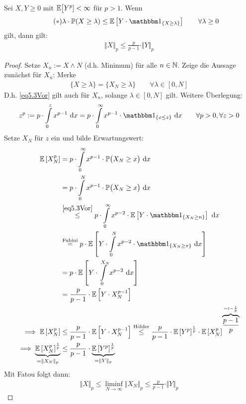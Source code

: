 \begin{lemma}\label{lemma5.3}
Sei $X,Y\geq0$ mit $\mathbb{E}\big[Y^p]<\infty$ für $p>1$. Wenn
\begin{align}\label{eq5.3Vor}\tag{$\ast$}
\lambda\cdot\P(X\geq\lambda)\leq\E\left[Y\cdot\indi_{\lbrace X\geq\lambda\rbrace}\right]\qquad\forall\lambda\geq0
\end{align}
gilt, dann gilt:
\begin{align*}
\Vert X\Vert_p\leq\frac{p}{p-1}\cdot\Vert Y\Vert_p
\end{align*}
\end{lemma}
\begin{proof}
Setze $X_n:=X\wedge N$ (d.h. Minimum) für alle $n\in\mathbb{N}$. Zeige die Aussage zunächst für $X_n$: Merke
\begin{align*}
\lbrace X\geq\lambda\rbrace=\lbrace X_N\geq\lambda\rbrace\qquad\forall\lambda\in[0,N]
\end{align*}
D.h. \eqref{eq5.3Vor} gilt auch für $X_n$, solange $\lambda\in[0,N]$ gilt. Weitere Überlegung:
\begin{align*} %
z^p:=p\cdot\int\limits_0^z x^{p-1}\d x=p\cdot\int\limits_0^\infty x^{p-1}\cdot\indi_{\lbrace x\leq z\rbrace}\d x\qquad\forall p>0,\forall z>0
\end{align*}
Setze $X_N$ für $z$ ein und bilde Erwartungswert:
\begin{align*}
\E\left[X_N^p\right]
&=p\cdot\int\limits_0^\infty x^{p-1}\cdot\P\big(X_N\geq x\big)\d x\\
&=p\cdot\int\limits_0^N x^{p-1}\cdot\P\big(X_N\geq x\big)\d x\\
&\stackrel{\eqref{eq5.3Vor}}{\leq}
p\cdot\int\limits_0^\infty x^{p-2}\cdot\E\left[Y\cdot\indi_{\lbrace X_N\geq n\rbrace}\right]\d x\\
&\stackeq{\text{Fubini}}
p\cdot\E\left[Y\cdot\int\limits_0^N x^{p-2}\cdot\indi_{\lbrace X_N\geq x\rbrace}\d x\right]\\
&=p\cdot\E\left[Y\cdot\int\limits_0^{X_N} x^{p-2}\d x\right]\\
&=\frac{p}{p-1}\cdot\E\left[Y\cdot X_N^{p-1}\right]\\
\implies
\E\left[X_N^p\right]
&\leq
\frac{p}{p-1}\cdot\E\left[Y\cdot X_N^{p-1}\right]
\stackrel{\text{Hölder}}{\leq}
\frac{p}{p-1}\cdot\E\left[Y^p\right]^{\frac{1}{p}}\cdot\E\left[X_N^p\right]^{\overbrace{\frac{p-1}{p}}^{=1-\frac{1}{p}}}\\
\implies
\underbrace{\E\left[X_N^p\right]^{\frac{1}{p}}}_{=\Vert X_N\Vert_p}
&\leq
\frac{p}{p-1}\cdot\underbrace{\E\left[Y^p\right]^{\frac{1}{p}}}_{=\Vert Y\Vert_p}
\end{align*}
Mit Fatou folgt dann:
\begin{align*}
\Vert X\Vert_p\leq\liminf\limits_{N\to\infty}\Vert X_N\Vert_p\leq\frac{p}{p-1}\cdot\Vert Y\Vert_p
\end{align*}
\end{proof}

